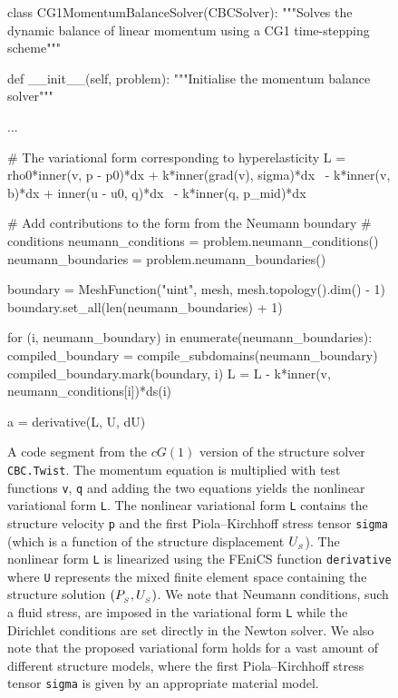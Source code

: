 \begin{figure}
\label{selim:fig:structuresolver}
\caption{A code segment from the $cG(1)$ version of the structure
  solver \texttt{CBC.Twist}.  The momentum equation is multiplied with
  test functions \texttt{v}, \texttt{q} and adding the two equations
  yields the nonlinear variational form \texttt{L}. The nonlinear
  variational form \texttt{L} contains the structure velocity
  \texttt{p} and the first Piola--Kirchhoff stress tensor
  \texttt{sigma} (which is a function of the structure
  displacement $U_{_{S}}$).  The nonlinear form \texttt{L} is
  linearized using the FEniCS function \texttt{derivative} where
  \texttt{U} represents the mixed finite element space containing the
  structure solution $(P_{_{S}}, U_{_{S}})$.  We note that Neumann
  conditions, such a fluid stress, are imposed in the variational form
  \texttt{L} while the Dirichlet conditions are set directly in the
  Newton solver. We also note that the proposed variational form holds
  for a vast amount of different structure models, where the first
  Piola--Kirchhoff stress tensor \texttt{sigma} is given by an
  appropriate material model.  }
\begin{python}
class CG1MomentumBalanceSolver(CBCSolver):
    """Solves the dynamic balance of linear momentum using a CG1
    time-stepping scheme"""

    def __init__(self, problem):
        """Initialise the momentum balance solver"""

        ...

        # The variational form corresponding to hyperelasticity
        L = rho0*inner(v, p - p0)*dx + k*inner(grad(v), sigma)*dx \
          - k*inner(v, b)*dx + inner(u - u0, q)*dx \
          - k*inner(q, p_mid)*dx

        # Add contributions to the form from the Neumann boundary
        # conditions
        neumann_conditions = problem.neumann_conditions()
        neumann_boundaries = problem.neumann_boundaries()

        boundary = MeshFunction("uint", mesh, mesh.topology().dim() - 1)
        boundary.set_all(len(neumann_boundaries) + 1)

        for (i, neumann_boundary) in enumerate(neumann_boundaries):
            compiled_boundary = compile_subdomains(neumann_boundary)
            compiled_boundary.mark(boundary, i)
            L = L - k*inner(v, neumann_conditions[i])*ds(i)

        a = derivative(L, U, dU)
\end{python}
\end{figure}


